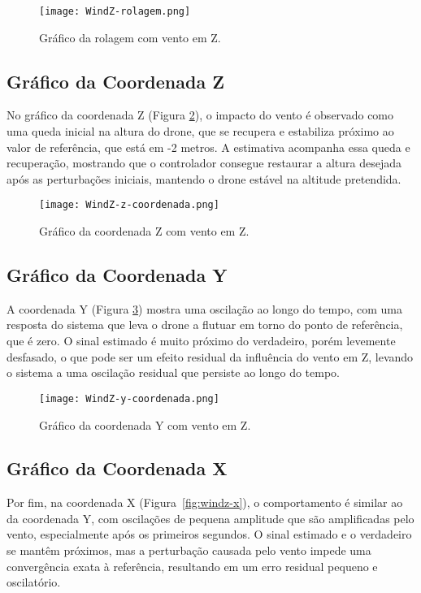 \begin{figure}[h!]
    \centering
    \texttt{[image: WindZ-rolagem.png]}
    \caption{Gráfico da rolagem com vento em Z.}
    \label{fig:windz-roll}
\end{figure}

\subsection*{Gráfico da Coordenada Z}
No gráfico da coordenada Z (Figura \ref{fig:windz-z}), o impacto do vento é observado como uma queda inicial na altura do drone, que se recupera e estabiliza próximo ao valor de referência, que está em -2 metros. A estimativa acompanha essa queda e recuperação, mostrando que o controlador consegue restaurar a altura desejada após as perturbações iniciais, mantendo o drone estável na altitude pretendida.

\begin{figure}[h!]
    \centering
    \texttt{[image: WindZ-z-coordenada.png]}
    \caption{Gráfico da coordenada Z com vento em Z.}
    \label{fig:windz-z}
\end{figure}

\subsection*{Gráfico da Coordenada Y}
A coordenada Y (Figura \ref{fig:windz-y}) mostra uma oscilação ao longo do tempo, com uma resposta do sistema que leva o drone a flutuar em torno do ponto de referência, que é zero. O sinal estimado é muito próximo do verdadeiro, porém levemente desfasado, o que pode ser um efeito residual da influência do vento em Z, levando o sistema a uma oscilação residual que persiste ao longo do tempo.

\begin{figure}[h!]
    \centering
    \texttt{[image: WindZ-y-coordenada.png]}
    \caption{Gráfico da coordenada Y com vento em Z.}
    \label{fig:windz-y}
\end{figure}

\subsection*{Gráfico da Coordenada X}
Por fim, na coordenada X (Figura~\ref{fig:windz-x}), o comportamento é similar ao da coordenada Y, com oscilações de pequena amplitude que são amplificadas pelo vento, especialmente após os primeiros segundos. O sinal estimado e o verdadeiro se mantêm próximos, mas a perturbação causada pelo vento impede uma convergência exata à referência, resultando em um erro residual pequeno e oscilatório.

